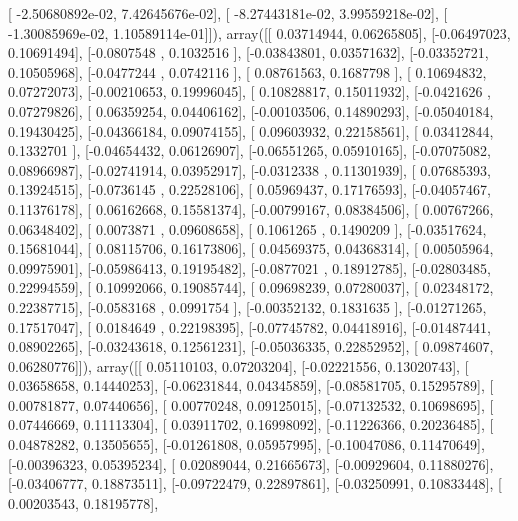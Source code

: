 \documentclass{article}
\begin{document}
       [ -2.50680892e-02,   7.42645676e-02],
       [ -8.27443181e-02,   3.99559218e-02],
       [ -1.30085969e-02,   1.10589114e-01]]), array([[ 0.03714944,  0.06265805],
       [-0.06497023,  0.10691494],
       [-0.0807548 ,  0.1032516 ],
       [-0.03843801,  0.03571632],
       [-0.03352721,  0.10505968],
       [-0.0477244 ,  0.0742116 ],
       [ 0.08761563,  0.1687798 ],
       [ 0.10694832,  0.07272073],
       [-0.00210653,  0.19996045],
       [ 0.10828817,  0.15011932],
       [-0.0421626 ,  0.07279826],
       [ 0.06359254,  0.04406162],
       [-0.00103506,  0.14890293],
       [-0.05040184,  0.19430425],
       [-0.04366184,  0.09074155],
       [ 0.09603932,  0.22158561],
       [ 0.03412844,  0.1332701 ],
       [-0.04654432,  0.06126907],
       [-0.06551265,  0.05910165],
       [-0.07075082,  0.08966987],
       [-0.02741914,  0.03952917],
       [-0.0312338 ,  0.11301939],
       [ 0.07685393,  0.13924515],
       [-0.0736145 ,  0.22528106],
       [ 0.05969437,  0.17176593],
       [-0.04057467,  0.11376178],
       [ 0.06162668,  0.15581374],
       [-0.00799167,  0.08384506],
       [ 0.00767266,  0.06348402],
       [ 0.0073871 ,  0.09608658],
       [ 0.1061265 ,  0.1490209 ],
       [-0.03517624,  0.15681044],
       [ 0.08115706,  0.16173806],
       [ 0.04569375,  0.04368314],
       [ 0.00505964,  0.09975901],
       [-0.05986413,  0.19195482],
       [-0.0877021 ,  0.18912785],
       [-0.02803485,  0.22994559],
       [ 0.10992066,  0.19085744],
       [ 0.09698239,  0.07280037],
       [ 0.02348172,  0.22387715],
       [-0.0583168 ,  0.0991754 ],
       [-0.00352132,  0.1831635 ],
       [-0.01271265,  0.17517047],
       [ 0.0184649 ,  0.22198395],
       [-0.07745782,  0.04418916],
       [-0.01487441,  0.08902265],
       [-0.03243618,  0.12561231],
       [-0.05036335,  0.22852952],
       [ 0.09874607,  0.06280776]]), array([[ 0.05110103,  0.07203204],
       [-0.02221556,  0.13020743],
       [ 0.03658658,  0.14440253],
       [-0.06231844,  0.04345859],
       [-0.08581705,  0.15295789],
       [ 0.00781877,  0.07440656],
       [ 0.00770248,  0.09125015],
       [-0.07132532,  0.10698695],
       [ 0.07446669,  0.11113304],
       [ 0.03911702,  0.16998092],
       [-0.11226366,  0.20236485],
       [ 0.04878282,  0.13505655],
       [-0.01261808,  0.05957995],
       [-0.10047086,  0.11470649],
       [-0.00396323,  0.05395234],
       [ 0.02089044,  0.21665673],
       [-0.00929604,  0.11880276],
       [-0.03406777,  0.18873511],
       [-0.09722479,  0.22897861],
       [-0.03250991,  0.10833448],
       [ 0.00203543,  0.18195778],
\end{document}
